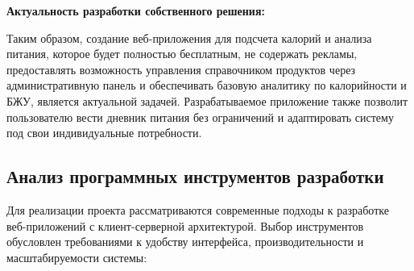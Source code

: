 \textbf{Актуальность разработки собственного решения:}

Таким образом, создание веб-приложения для подсчета калорий и анализа питания, которое будет полностью бесплатным, не содержать рекламы, предоставлять возможность управления справочником продуктов через административную панель и обеспечивать базовую аналитику по калорийности и БЖУ, является актуальной задачей. Разрабатываемое приложение также позволит пользователю вести дневник питания без ограничений и адаптировать систему под свои индивидуальные потребности.

\subsection{Анализ программных инструментов разработки}

Для реализации проекта рассматриваются современные подходы к разработке веб-приложений с клиент-серверной архитектурой. Выбор инструментов обусловлен требованиями к удобству интерфейса, производительности и масштабируемости системы:

